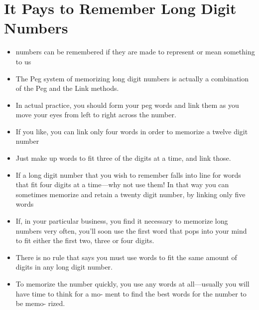     \section*{It Pays to Remember Long Digit Numbers}
        \begin{itemize}
            \item numbers can be remembered if they are made to represent
            or mean something to us
            \item The Peg system of memorizing long digit numbers is
            actually a combination of the Peg and the Link methods.
            \item In
            actual practice, you should form your peg words and link
            them as you move your eyes from left to right across the
            number.
            \item If you like, you can link only
            four words in order to memorize a twelve digit number
            \item Just make up words to fit three of the digits at a time, and
            link those.
            \item If a long digit number that you wish to remember falls
            into line for words that fit four digits at a time—why not
            use them! In that way you can sometimes memorize and
            retain a twenty digit number, by linking only five words
            \item If, in your particular business, you find it necessary to
            memorize long numbers very often, you'll soon use the first
            word that pops into your mind to fit either the first two,
            three or four digits.
            \item There is no rule that says you must use
            words to fit the same amount of digits in any long digit
            number.
            \item To memorize the number quickly, you use any
            words at all—usually you will have time to think for a mo-
            ment to find the best words for the number to be memo-
            rized.
        \end{itemize}

